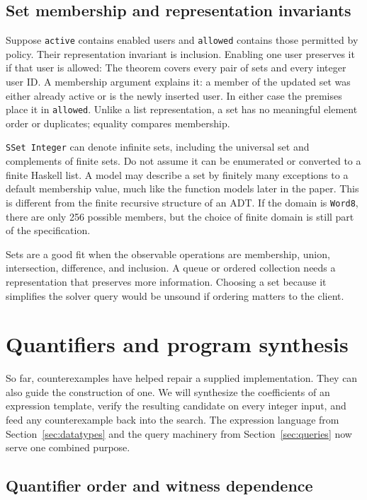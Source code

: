 \documentclass[review]{jfp-epi}
\newcommand{\code}[1]{\texttt{#1}}
\begin{document}
\subsection{Set membership and representation invariants}
\label{sec:sets}

Suppose \code{active} contains enabled users and \code{allowed} contains those
permitted by policy. Their representation invariant is inclusion. Enabling one
user preserves it if that user is allowed:
The theorem covers every pair of sets and every integer user ID. A membership
argument explains it: a member of the updated set was either already active or
is the newly inserted user. In either case the premises place it in
\code{allowed}. Unlike a list representation, a set has no meaningful element
order or duplicates; equality compares membership.

\code{SSet Integer} can denote infinite sets, including the universal set and
complements of finite sets. Do not assume it can be enumerated or converted to
a finite Haskell list. A model may describe a set by finitely many exceptions
to a default membership value, much like the function models later in the paper.
This is different from the finite recursive structure of an ADT. If the domain
is \code{Word8}, there are only 256 possible members, but the choice of finite
domain is still part of the specification.

Sets are a good fit when the observable operations are membership, union,
intersection, difference, and inclusion. A queue or ordered collection needs a
representation that preserves more information. Choosing a set because it
simplifies the solver query would be unsound if ordering matters to the client.


\section{Quantifiers and program synthesis}
\label{sec:synthesis}

So far, counterexamples have helped repair a supplied implementation. They can
also guide the construction of one. We will synthesize the coefficients of an
expression template, verify the resulting candidate on every integer input,
and feed any counterexample back into the search. The expression language from
Section~\ref{sec:datatypes} and the query machinery from Section~\ref{sec:queries}
now serve one combined purpose.


\subsection{Quantifier order and witness dependence}
\label{sec:quantifiers}
\end{document}
